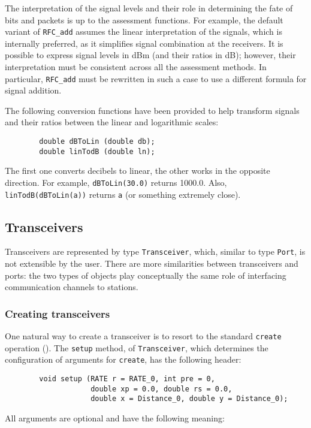 The interpretation of the signal levels and their role in determining the fate
of bits and packets is up to the assessment functions. 
For example, the default variant of {\tt RFC\_add} assumes the linear
interpretation of the signals, which is internally preferred,
as it simplifies signal combination at the receivers.
It is possible to express signal levels in dBm (and their ratios in dB);
however, their interpretation must be consistent across all the
assessment methods.
In particular, {\tt RFC\_add} must be rewritten in such a case to use a
different formula for signal addition.

The following conversion functions have been provided to help transform
signals and their ratios between the linear and logarithmic scales:

\begin{verbatim}
        double dBToLin (double db);
        double linTodB (double ln);
\end{verbatim}

\noindent
The first one converts decibels to linear, the other works in the opposite
direction.
For example, {\tt dBToLin(30.0)} returns 1000.0.
Also, {\tt linTodB(dBToLin(a))} returns {\tt a} (or something extremely close).

\subsection{Transceivers}
\label{rm_to_tr}

Transceivers are represented by type {\tt Transceiver}, which, similar to
type {\tt Port}, is not extensible by the user.
There are more similarities between transceivers and ports: the two types
of objects play conceptually the same role of interfacing communication
channels to stations.

\subsubsection{Creating transceivers}
\label{rm_to_tr_cr}

One natural way to create a transceiver is to resort to the standard
{\tt create} operation ().
The {\tt setup} method, of {\tt Transceiver},
which determines the configuration of arguments for
{\tt create}, has the following header:
\begin{verbatim}
        void setup (RATE r = RATE_0, int pre = 0,
                    double xp = 0.0, double rs = 0.0,
                    double x = Distance_0, double y = Distance_0);
\end{verbatim}
\noindent
All arguments are optional and have the following meaning:

